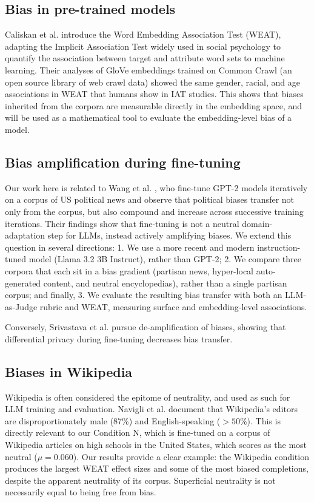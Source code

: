 \documentclass{article}
\begin{document}
\subsection{Bias in pre-trained models}
Caliskan et al. \cite{caliskan2017} introduce the Word Embedding Association Test (WEAT), adapting the Implicit Association Test widely used in social psychology to quantify the association between target and attribute word sets to machine learning. 
Their analyses of GloVe embeddings trained on Common Crawl (an open source library of web crawl data) showed the same gender, racial, and age associations in WEAT that humans show in IAT studies. 
This shows that biases inherited from the corpora are measurable directly in the embedding space, and will be used as a mathematical tool to evaluate the embedding-level bias of a model.

\subsection{Bias amplification during fine-tuning}
Our work here is related to Wang et al. \cite{wang2024bias}, who fine-tune GPT-2 models iteratively on a corpus of US political news and observe that political biases transfer not only from the corpus, but also compound and increase across successive training iterations.
Their findings show that fine-tuning is not a neutral domain-adaptation step for LLMs, instead actively amplifying biases.
We extend this question in several directions: 
1. We use a more recent and modern instruction-tuned model (Llama 3.2 3B Instruct), rather than GPT-2;
2. We compare three corpora that each sit in a bias gradient (partisan news, hyper-local auto-generated content, and neutral encyclopedias), rather than a single partisan corpus;
and finally, 3. We evaluate the resulting bias transfer with both an LLM-as-Judge rubric and WEAT, measuring surface and embedding-level associations.

Conversely, Srivastava et al. \cite{srivastava2024} pursue de-amplification of biases, showing that differential privacy during fine-tuning decreases bias transfer. 

\subsection{Biases in Wikipedia}
Wikipedia is often considered the epitome of neutrality, and used as such for LLM training and evaluation. 
Navigli et al. \cite{navigli2023} document that Wikipedia's editors are disproportionately male (87\%) and English-speaking ($>50\%$). 
This is directly relevant to our Condition N, which is fine-tuned on a corpus of Wikipedia articles on high schools in the United States, which scores as the most neutral ($\mu = 0.060$). 
Our results provide a clear example: the Wikipedia condition produces the largest WEAT effect sizes and some of the most biased completions, despite the apparent neutrality of its corpus.  
Superficial neutrality is not necessarily equal to being free from bias.
\end{document}
